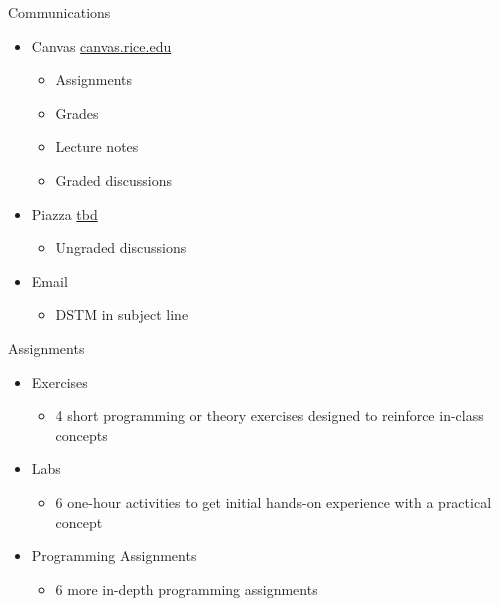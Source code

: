 \documentclass[aspectratio=169]{beamer}
\begin{document}
\begin{frame}{Communications}
\begin{itemize}
\item Canvas  \url{canvas.rice.edu}
\begin{itemize}
\item Assignments 
\item Grades
\item Lecture notes
\item Graded discussions
\end{itemize}
\item Piazza \url{tbd}
\begin{itemize}
\item Ungraded discussions
\end{itemize}
\item Email
\begin{itemize}
\item DSTM in subject line
\end{itemize}
\end{itemize}
\end{frame}
\begin{frame}{Assignments}

\begin{itemize}
\item Exercises
	\begin{itemize}
	\item 4 short programming or theory exercises designed to reinforce in-class concepts
	\end{itemize}
\item Labs
	\begin{itemize}
	\item 6 one-hour activities to get initial hands-on experience with a practical concept
	\end{itemize}
\item Programming Assignments
	\begin{itemize}
	\item 6 more in-depth programming assignments
	\end{itemize}
\end{itemize}
\end{frame}
\end{document}
